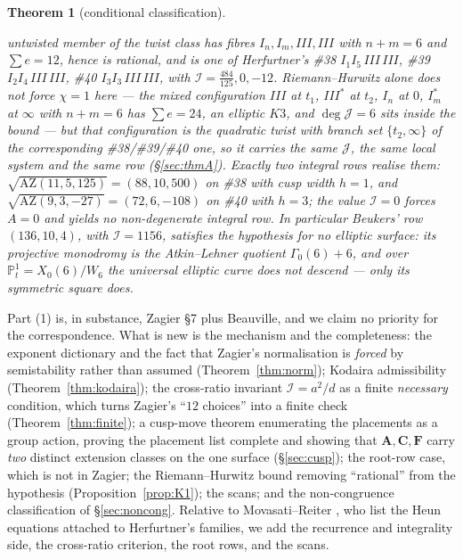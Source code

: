 \documentclass[11pt,reqno]{amsart}
\theoremstyle{plain}
\theoremstyle{definition}
\theoremstyle{remark}
\theoremstyle{plain}
\newtheorem{namedthm}{Theorem}
\newcommand{\PP}{\mathbb{P}}
\begin{document}
\begin{namedthm}[conditional classification]
\begin{enumerate}[label=\textup{(\arabic*)},leftmargin=2.6em]
untwisted member of the twist class has fibres $I_n,I_m,III,III$ with $n+m=6$ and
$\sum e=12$, hence is \emph{rational}, and is one of Herfurtner's \#38
$I_1I_5\,III\,III$, \#39 $I_2I_4\,III\,III$, \#40 $I_3I_3\,III\,III$, with
$\mathcal I=\tfrac{484}{125},0,-12$. Riemann--Hurwitz alone does \emph{not} force
$\chi=1$ here --- the mixed configuration $III$ at $t_1$, $III^*$ at $t_2$, $I_n$
at $0$, $I_m^*$ at $\infty$ with $n+m=6$ has $\sum e=24$, an elliptic $K3$, and
$\deg\mathcal J=6$ sits inside the bound --- but that configuration is the
quadratic twist with branch set $\{t_2,\infty\}$ of the corresponding
\#38/\#39/\#40 one, so it carries the same $\mathcal J$, the same local system and
the same row \textup{(}\S\ref{sec:thmA}\textup{)}. Exactly two integral rows
realise them:
$\sqrt{\mathrm{AZ}(11,5,125)}=(88,10,500)$ on \#38 with cusp width $h=1$, and
$\sqrt{\mathrm{AZ}(9,3,-27)}=(72,6,-108)$ on \#40 with $h=3$; the value
$\mathcal I=0$ forces $A=0$ and yields no non-degenerate integral row. In
particular \emph{Beukers' row} $(136,10,4)$, with $\mathcal I=1156$, satisfies the
hypothesis for no elliptic surface: its projective monodromy is the
Atkin--Lehner quotient $\Gamma_0(6)+6$, and over $\PP^1_t=X_0(6)/W_6$ the
universal elliptic curve does not descend --- only its symmetric square does.
\end{enumerate}
\end{namedthm}

Part (1) is, in substance, Zagier \S7 plus Beauville, and we claim no priority
for the correspondence. What is new is the mechanism and the completeness: the
exponent dictionary and the fact that Zagier's normalisation is \emph{forced} by
semistability rather than assumed (Theorem~\ref{thm:norm}); Kodaira admissibility
(Theorem~\ref{thm:kodaira}); the cross-ratio invariant $\mathcal I=a^2/d$ as a
finite \emph{necessary} condition, which turns Zagier's ``$12$ choices'' into a
finite check (Theorem~\ref{thm:finite}); a cusp-move theorem enumerating the
placements as a group action, proving the placement list complete and showing
that $\mathbf A,\mathbf C,\mathbf F$ carry \emph{two} distinct extension classes
on the one surface (\S\ref{sec:cusp}); the root-row case, which is not in Zagier;
the Riemann--Hurwitz bound removing ``rational'' from the hypothesis
(Proposition~\ref{prop:K1}); the scans; and the non-congruence classification of
\S\ref{sec:noncong}. Relative to Movasati--Reiter \cite{MovasatiReiter}, who list
the Heun equations attached to Herfurtner's families, we add the recurrence and
integrality side, the cross-ratio criterion, the root rows, and the scans.
\end{document}
